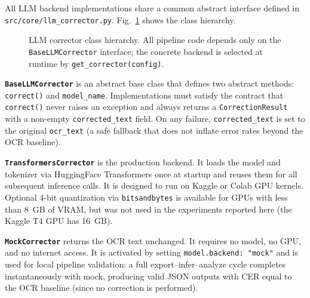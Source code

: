 All LLM backend implementations share a common abstract interface defined in
\texttt{src/core/llm\_corrector.py}.
Fig.~\ref{fig:corrector} shows the class hierarchy.

\begin{figure}[ht]
\centering
{}
\caption{LLM corrector class hierarchy. All pipeline code depends only on the
         \texttt{BaseLLMCorrector} interface; the concrete backend is selected
         at runtime by \texttt{get\_corrector(config)}.}
\label{fig:corrector}
\end{figure}

\textbf{\texttt{BaseLLMCorrector}} is an abstract base class that defines two
abstract methods: \texttt{correct()} and \texttt{model\_name}.
Implementations must satisfy the contract that \texttt{correct()} never raises
an exception and always returns a \texttt{CorrectionResult} with a non-empty
\texttt{corrected\_text} field.
On any failure, \texttt{corrected\_text} is set to the original
\texttt{ocr\_text} (a safe fallback that does not inflate error rates beyond
the OCR baseline).

\textbf{\texttt{TransformersCorrector}} is the production backend.
It loads the model and tokenizer via HuggingFace Transformers once at startup
and reuses them for all subsequent inference calls.
It is designed to run on Kaggle or Colab GPU kernels.
Optional 4-bit quantization via \texttt{bitsandbytes} is available for GPUs
with less than 8~GB of VRAM, but was not used in the experiments reported here
(the Kaggle T4 GPU has 16~GB).

\textbf{\texttt{MockCorrector}} returns the OCR text unchanged.
It requires no model, no GPU, and no internet access.
It is activated by setting \texttt{model.backend: "mock"} and is used for
local pipeline validation: a full export--infer--analyze cycle completes
instantaneously with mock, producing valid JSON outputs with CER equal to the
OCR baseline (since no correction is performed).

